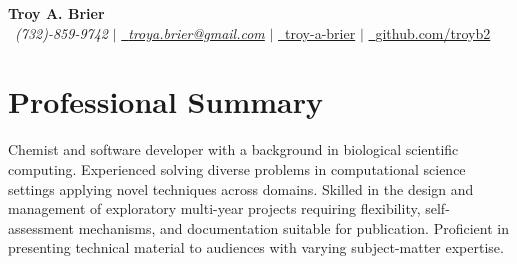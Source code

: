 \documentclass[letterpaper,10pt]{article}
\makeatletter
\newcommand{\sectionspace}{
\vspace{-17pt}
}
\newcommand{\subheadingtitlevspace}{
\vspace{-3pt}
}
\newcommand{\titleItem}[1]{
  \textbf{#1}
}
\newcommand{\resumeProjectHeading}[2]{
    \item
    \begin{tabular*}{0.97\textwidth}{l@{\extracolsep{\fill}}r}
      #1 & \textit{ #2} \\
    \end{tabular*}\vspace{-9pt}
}
\newcommand{\resumeSubHeadingListStart}{\subheadingtitlevspace\begin{itemize}[leftmargin=0.15in, label={}]}
\newcommand{\resumeSubHeadingListEnd}{\end{itemize}}
\makeatother
\begin{document}
\begin{flushleft}
    \textbf{\Large Troy A. Brier} \\    
    \Mobilefone~\textcolor{color1}{\textit{(732)-859-9742}} {\large $|$}
    \href{mailto:troya.brier@gmail.com}{{\Letter~\textcolor{color1}{\textit{troya.brier@gmail.com}}}} {\large $|$}
    \href{https://www.linkedin.com/in/troy-a-brier/}{\faLinkedin~\textcolor{color1}{troy-a-brier}} {\large $|$}
    \href{https://github.com/troyb2}{\Keyboard~\textcolor{color1}{github.com/troyb2}} %
    \vspace{-8pt}
\end{flushleft}

\section{\textcolor{color1}{Professional Summary}}
\vspace{-3pt}
\begin{itemize}[leftmargin=0.15in, label={}]
    {\item{
        {Chemist and software developer with a background in biological scientific computing.
         Experienced solving diverse problems in computational science settings applying novel techniques across domains.
         Skilled in the design and management of exploratory multi-year projects requiring flexibility, self-assessment mechanisms, and documentation suitable for publication.
         Proficient in presenting technical material to audiences with varying subject-matter expertise.
        } \\
    }}
 \end{itemize}
 \sectionspace


          
\end{document}
